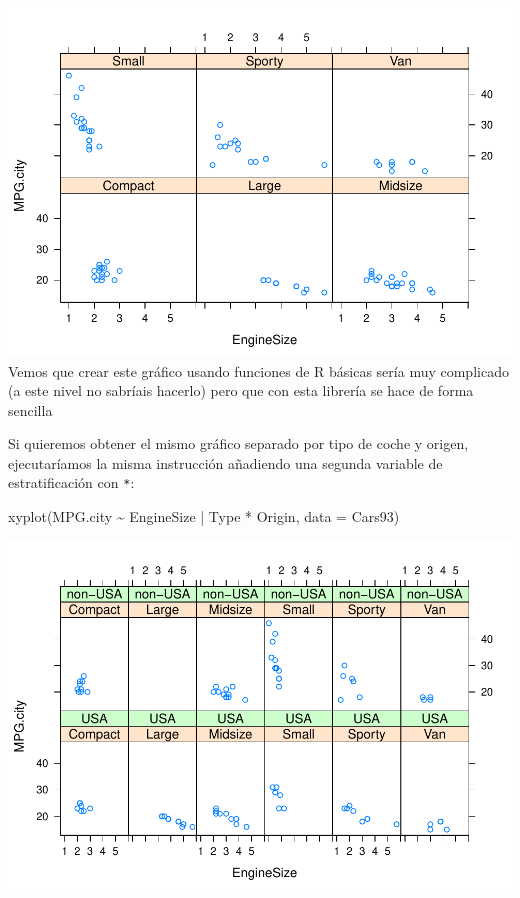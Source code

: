 \documentclass[
]{book}
\newenvironment{Shaded}{\begin{snugshade}}{\end{snugshade}}
\newcommand{\AttributeTok}[1]{\textcolor[rgb]{0.77,0.63,0.00}{#1}}
\newcommand{\FunctionTok}[1]{\textcolor[rgb]{0.00,0.00,0.00}{#1}}
\newcommand{\NormalTok}[1]{#1}
\newcommand{\SpecialCharTok}[1]{\textcolor[rgb]{0.00,0.00,0.00}{#1}}
\begin{document}
\includegraphics{fig/unnamed-chunk-111-1.pdf}
Vemos que crear este gráfico usando funciones de R básicas sería muy complicado (a este nivel no sabríais hacerlo) pero que con esta librería se hace de forma sencilla

Si quieremos obtener el mismo gráfico separado por tipo de coche y origen, ejecutaríamos la misma instrucción añadiendo una segunda variable de estratificación con \texttt{*}:

\begin{Shaded}
\begin{Highlighting}[]
\FunctionTok{xyplot}\NormalTok{(MPG.city }\SpecialCharTok{\textasciitilde{}}\NormalTok{ EngineSize }\SpecialCharTok{|}\NormalTok{ Type }\SpecialCharTok{*}\NormalTok{ Origin, }
       \AttributeTok{data =}\NormalTok{ Cars93)}
\end{Highlighting}
\end{Shaded}

\includegraphics{fig/unnamed-chunk-112-1.pdf}
\end{document}
